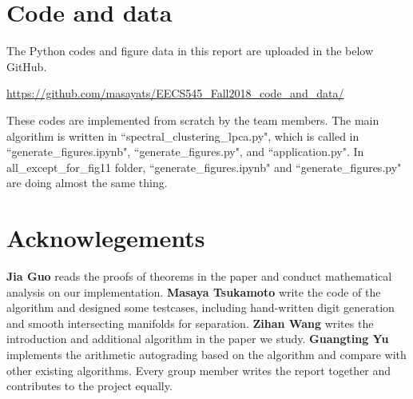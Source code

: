 \documentclass{article}
\begin{document}
\section{Code and data}                
The Python codes and figure data in this report are uploaded in the below GitHub.

\href{https://github.com/masayats/EECS545_Fall2018_code_and_data/}{\url{https://github.com/masayats/EECS545_Fall2018_code_and_data/}}

These codes are implemented from scratch by the team members.
The main algorithm is written in ``spectral\_clustering\_lpca.py", which is called in ``generate\_figures.ipynb", ``generate\_figures.py", and ``application.py". In all\_except\_for\_fig11 folder,  ``generate\_figures.ipynb" and  ``generate\_figures.py" are doing almost the same thing.


\section{Acknowlegements}
\textbf{Jia Guo} reads the proofs of theorems in the paper and conduct mathematical analysis on our implementation.
\textbf{Masaya Tsukamoto} write the code of the algorithm and designed some testcases, including hand-written digit generation and smooth intersecting manifolds for separation.
\textbf{Zihan Wang} writes the introduction and additional algorithm in the paper we study.
\textbf{Guangting Yu} implements the arithmetic autograding based on the algorithm and compare with other existing algorithms.
Every group member writes the report together and contributes to the project equally.

\medskip
\small

% 
% 

\clearpage



\end{document}
